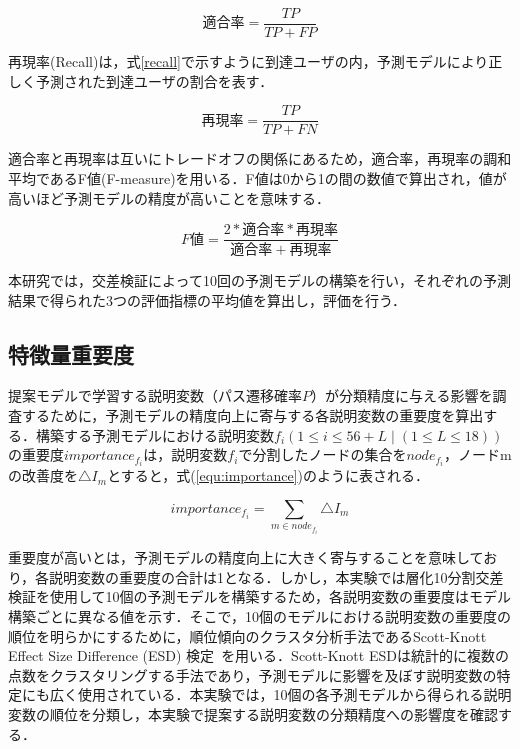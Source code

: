 \documentclass[11pt,dvipdfmx]{jreport}
\begin{document}
\begin{equation}
  適合率 = \frac{TP}{TP + FP} \label{precision}
\end{equation}
\vspace{.5mm}

再現率(Recall)は，式\ref{recall}で示すように到達ユーザの内，予測モデルにより正しく予測された到達ユーザの割合を表す．

\begin{equation}
  再現率 = \frac{TP}{TP + FN} \label{recall}
\end{equation}
\vspace{.5mm}

適合率と再現率は互いにトレードオフの関係にあるため，適合率，再現率の調和平均であるF値(F-measure)を用いる．F値は0から1の間の数値で算出され，値が高いほど予測モデルの精度が高いことを意味する．

\begin{equation}
  F値 = \frac{2 * 適合率 * 再現率}{適合率 + 再現率} \label{f-measure}
\end{equation}
\vspace{.5mm}

本研究では，交差検証によって10回の予測モデルの構築を行い，それぞれの予測結果で得られた3つの評価指標の平均値を算出し，評価を行う．

\subsection{特徴量重要度}

提案モデルで学習する説明変数（パス遷移確率$P$）が分類精度に与える影響を調査するために，予測モデルの精度向上に寄与する各説明変数の重要度を算出する．構築する予測モデルにおける説明変数\(f_{i}(1 \leq i \leq 56 + L \mid (1 \leq L \leq 18))\)の重要度\(importance_{f_{i}}\)は，説明変数\(f_{i}\)で分割したノードの集合を\(node_{f_{i}}\)，ノードmの改善度を\(\triangle I_{m}\)とすると，式(\ref{equ:importance})のように表される．


\begin{equation}
	\label{equ:importance}
	importance_{f_{i}}=\sum_{m\in node_{f_{i}}}\triangle{I_{m}}
\end{equation}
\vspace{0.5mm}


\noindent 重要度が高いとは，予測モデルの精度向上に大きく寄与することを意味しており，各説明変数の重要度の合計は1となる．しかし，本実験では層化10分割交差検証を使用して10個の予測モデルを構築するため，各説明変数の重要度はモデル構築ごとに異なる値を示す．そこで，10個のモデルにおける説明変数の重要度の順位を明らかにするために，順位傾向のクラスタ分析手法であるScott-Knott Effect Size Difference (ESD) 検定~\cite{Tantithamthavorn_2019}を用いる．Scott-Knott ESDは統計的に複数の点数をクラスタリングする手法であり，予測モデルに影響を及ぼす説明変数の特定にも広く使用されている．本実験では，10個の各予測モデルから得られる説明変数の順位を分類し，本実験で提案する説明変数の分類精度への影響度を確認する．
\end{document}
